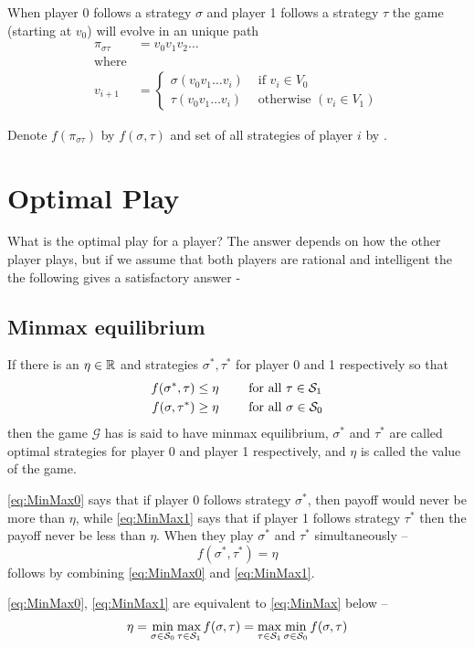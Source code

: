 When player 0 follows a strategy $\sigma$ and player 1 follows a strategy $\tau$ the game (starting at $v_0$) will evolve in an unique path 
\begin{align}
    \pi_{\sigma\tau} &= v_0v_1v_2\ldots\\
    \text{where}\nonumber\\
    v_{i+1} &= 
\begin{cases}
    \sigma(v_0v_1\ldots v_i) & \text{ if } v_i \in V_0\\
    \tau(v_0v_1\ldots v_i) & \text{ otherwise } (v_i \in V_1)
\end{cases}
\end{align}

Denote $f(\pi_{\sigma\tau})$ by $f(\sigma,\tau)$ and set of all strategies of player $i$ by .
\section{Optimal Play}
What is the optimal play for a player? The answer depends on how the other player plays, but if we assume that both players are rational and intelligent the the following gives a satisfactory answer - 

\subsection{Minmax equilibrium}
If there is an $\eta \in \mathbb{R}$ and strategies $\sigma^*,\tau^*$ for player 0 and 1 respectively so that
\begin{align}
    f(\sigma^*,\tau) \leq \eta \qquad & \text{ for all } \tau \in \mathcal{S}_1  \label{eq:MinMax0} \\
    f(\sigma, \tau^*)  \geq \eta \qquad & \text{ for all } \sigma \in \mathcal{S}_0 \label{eq:MinMax1}
\end{align}
then the game $\mathcal{G}$ has is said to have minmax equilibrium, $\sigma^*$ and $\tau^*$ are called optimal strategies for player 0 and player 1 respectively, and $\eta$ is called the value of the game.

\eqref{eq:MinMax0} says that if player 0 follows strategy $\sigma^*$, then payoff would never be more than $\eta$, while \eqref{eq:MinMax1} says that if player 1 follows strategy $\tau^*$ then the payoff never be less than $\eta$. When they play $\sigma^*$ and $\tau^*$ simultaneously -- 
\[
    f(\sigma^*,\tau^*) = \eta
\]
follows by combining \eqref{eq:MinMax0} and \eqref{eq:MinMax1}.

\eqref{eq:MinMax0}, \eqref{eq:MinMax1} are equivalent to \eqref{eq:MinMax} below --
\begin{align}
    \eta = \min_{\sigma \in \mathcal{S}_0} \max_{\tau \in \mathcal{S}_1} f(\sigma, \tau) = \max_{\tau \in \mathcal{S}_1} \min_{\sigma \in \mathcal{S}_0 } f(\sigma,\tau) \label{eq:MinMax}
\end{align}

